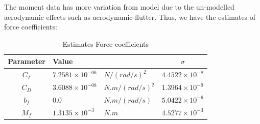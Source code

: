The moment data has more variation from model due to the un-modelled aerodynamic effects such as aerodynamic-flutter. Thus, we have the estimates of force coefficients:

\begin{table}[H]
    \centering
    \begin{tabular}{c l l c}
        \hline \hline
        Parameter & Value & & $\sigma$            \\ \hline \hline
        $C_T$ & $7.2581 \times 10^{-06}$ &$N/(rad/s)^2$  &$4.4522 \times 10^{-8}$\\
        $C_D$ & $3.6088 \times 10^{-08}$ &$N.m/(rad/s)^2$& $1.3964 \times 10^{-9}$\\
        $b_f$ & $0.0$                    &$N.m/(rad/s)$  &$5.0422 \times 10^{-6}$\\
        $M_f$ & $1.3135 \times 10^{-3}$  &$N.m$          &$4.5277 \times 10^{-3}$\\
        \hline \hline
    \end{tabular}
    \caption{Estimates Force coefficients}
\end{table}
